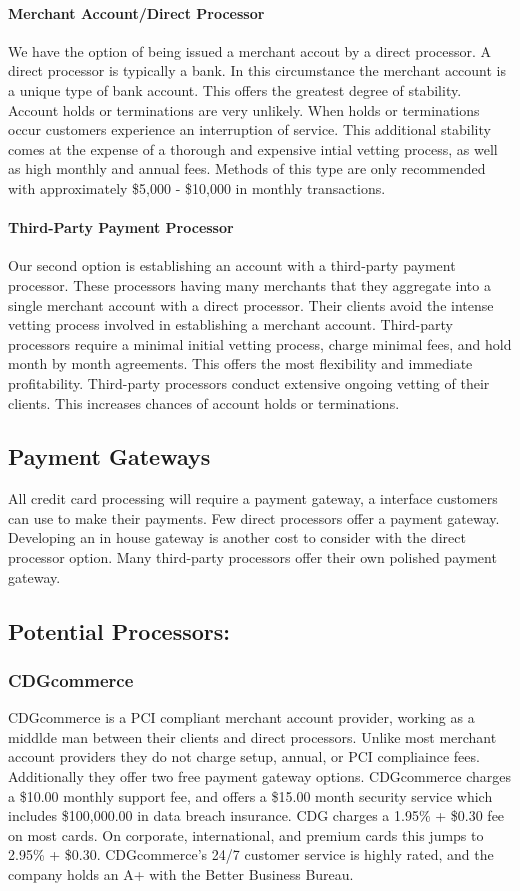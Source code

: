 \documentclass[letterpaper]{article}
\begin{document}
      \paragraph{Merchant Account/Direct Processor}
        We have the option of being issued a merchant accout by a direct processor. A direct processor
        is typically a bank. In this circumstance the merchant account is a unique type of bank account.
        This offers the greatest degree of stability. Account holds or terminations are very unlikely.
        When holds or terminations occur customers experience an interruption of service.
        This additional stability comes at the expense of a thorough and expensive intial vetting process, as well
        as high monthly and annual fees. Methods of this type are only recommended with approximately \$5,000 - \$10,000
        in monthly transactions.
      \paragraph{Third-Party Payment Processor}
        Our second option is establishing an account with a third-party payment processor. These processors having many
        merchants that they aggregate into a single merchant account with a direct processor. Their clients avoid
        the intense vetting process involved in establishing a merchant account. Third-party processors require a minimal initial vetting process,
        charge minimal fees, and hold month by month agreements. This offers the most flexibility and immediate profitability. Third-party processors conduct
        extensive ongoing vetting of their clients. This increases chances of account holds or terminations.
    \subsection{Payment Gateways}
        All credit card processing will require a payment gateway, a interface customers can use to make their payments.
        Few direct processors offer a payment gateway. Developing an in house gateway is another cost to consider with the direct processor option.
        Many third-party processors offer their own polished payment gateway.
    \subsection{Potential Processors:}
      \subsubsection{CDGcommerce}
        CDGcommerce is a PCI compliant merchant account provider, working as a middlde man between their clients and direct processors.
        Unlike most merchant account providers they do not charge setup, annual, or PCI compliaince fees. Additionally they
        offer two free payment gateway options. CDGcommerce charges a \$10.00 monthly support fee, and offers a \$15.00 month security service which includes
        \$100,000.00 in data breach insurance. CDG charges a 1.95\% + \$0.30 fee on most cards. On corporate, international, and premium cards this jumps to
        2.95\% + \$0.30. CDGcommerce's 24/7 customer service is highly rated, and the company holds an A+ with the Better Business Bureau.
\end{document}
